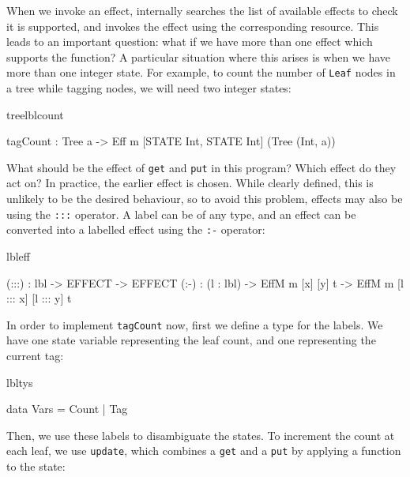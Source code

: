 When we invoke an effect, %
\Eff{} internally searches the list of available effects to check
it is supported, and invokes the effect using the corresponding
resource. This leads to an important question: what if we have more than one 
effect which supports the function? A particular situation where this arises
is when we have more than one integer state.
%
For example, to count the number of \texttt{Leaf} nodes
in a tree while tagging nodes, we will need two integer states:

\begin{SaveVerbatim}{treelblcount}

tagCount : Tree a -> 
     Eff m [STATE Int, STATE Int] (Tree (Int, a))

\end{SaveVerbatim}

\noindent
What should be the effect of \texttt{get} and \texttt{put} in this program?
Which effect do they act on?
%
In practice, the earlier effect is chosen. While clearly defined, this is
unlikely to be the desired behaviour, so 
to avoid this problem, effects may also be  using the
\texttt{:::} operator.  A label can be of any type, and an
effect can be converted into a labelled effect using the \texttt{:-}
operator:

\begin{SaveVerbatim}{lbleff}

(:::) : lbl -> EFFECT -> EFFECT
(:-)  : (l : lbl) -> EffM m [x] [y] t -> 
                     EffM m [l ::: x] [l ::: y] t

\end{SaveVerbatim}

\noindent
In order to implement \texttt{tagCount} now, first we define a type for the
labels. We have one state variable representing the leaf count, and one
representing the current tag:

\begin{SaveVerbatim}{lbltys}

data Vars = Count | Tag

\end{SaveVerbatim}

\noindent
Then, we use these labels to disambiguate the states. To increment the count
at each leaf, we use \texttt{update}, which combines a \texttt{get} and a
\texttt{put} by applying a function to the state:

